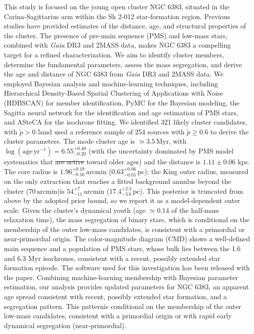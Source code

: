 \documentclass{aa}
\providecommand{\DIFaddtex}[1]{{\protect\color{red}\uwave{#1}}} %
\providecommand{\DIFdeltex}[1]{{\protect\color{red}\sout{#1}}} %
\providecommand{\DIFaddbegin}{} %
\providecommand{\DIFaddend}{} %
\providecommand{\DIFdelbegin}{} %
\providecommand{\DIFdelend}{} %
\providecommand{\DIFadd}[1]{\texorpdfstring{\DIFaddtex{#1}}{#1}} %
\providecommand{\DIFdel}[1]{\texorpdfstring{\DIFdeltex{#1}}{}} %
\providecommand{\DIFscaledelfig}{0.5}
\newlength{\DIFdelgraphicswidth} %
\newlength{\DIFdelgraphicsheight} %
\providecommand{\DIFaddincludegraphics}[2][]{{\color{blue}\fbox{\DIFOincludegraphics[#1]{#2}}}} %
\providecommand{\DIFdelincludegraphics}[2][]{%
\sbox{\DIFdelgraphicsbox}{\DIFOincludegraphics[#1]{#2}}%
\settoboxwidth{\DIFdelgraphicswidth}{\DIFdelgraphicsbox} %
\settoboxtotalheight{\DIFdelgraphicsheight}{\DIFdelgraphicsbox} %
\scalebox{\DIFscaledelfig}{%
\parbox[b]{\DIFdelgraphicswidth}{\usebox{\DIFdelgraphicsbox}\\[-\baselineskip] \rule{\DIFdelgraphicswidth}{0em}}\llap{\resizebox{\DIFdelgraphicswidth}{\DIFdelgraphicsheight}{%
\setlength{\unitlength}{\DIFdelgraphicswidth}%
\begin{picture}(1,1)%
\thicklines\linethickness{2pt} %
{\color[rgb]{1,0,0}\put(0,0){\framebox(1,1){}}}%
{\color[rgb]{1,0,0}\put(0,0){\line( 1,1){1}}}%
{\color[rgb]{1,0,0}\put(0,1){\line(1,-1){1}}}%
\end{picture}%
}\hspace*{3pt}}} %
} %
\DeclareRobustCommand{\DIFaddbegin}{\DIFOaddbegin \let\includegraphics\DIFaddincludegraphics} %
\DeclareRobustCommand{\DIFaddend}{\DIFOaddend \let\includegraphics\DIFOincludegraphics} %
\DeclareRobustCommand{\DIFdelbegin}{\DIFOdelbegin \let\includegraphics\DIFdelincludegraphics} %
\DeclareRobustCommand{\DIFdelend}{\DIFOaddend \let\includegraphics\DIFOincludegraphics} %
\begin{document}
  \abstract
   {This study is focused on the young open cluster NGC 6383, situated in the Carina-Sagittarius arm within the Sh 2-012 star-formation region. Previous studies have provided estimates of the distance, age, and structural properties of the cluster. The presence of pre-main sequence (PMS) and low-mass stars, combined with \textit{Gaia} DR3 and 2MASS data, makes NGC 6383 a compelling target for a refined characterization.}
   {We aim to identify cluster members, determine the fundamental parameters, assess the mass segregation, and derive the age and distance of NGC 6383 from \textit{Gaia} DR3 and 2MASS data.}
   {We employed Bayesian analysis and machine-learning techniques, including Hierarchical Density-Based Spatial Clustering of Applications with Noise (HDBSCAN) for member identification, PyMC for the Bayesian modeling, the Sagitta neural network for the identification and age estimation of PMS stars, and ASteCA for the isochrone fitting.}   
   {We identified 321 likely cluster candidates, with $\tilde{p}>0.5$\DIFaddbegin \DIFadd{, }\DIFaddend and used a reference sample of 254 sources with $\tilde{p}\geq0.6$ to derive the cluster parameters. The mode cluster age is $\simeq3.5\,\mathrm{Myr}$, with $\log(\mathrm{age}\,\mathrm{yr^{-1}}) = 6.55^{+0.40}_{-0.20}$ (with the uncertainty dominated by PMS model systematics that \DIFdelbegin \DIFdel{are active }\DIFdelend \DIFaddbegin \DIFadd{act }\DIFaddend toward older ages) and the distance is $1.11\pm 0.06$ kpc. The core radius is $1.96^{+0.19}_{-0.16}\,\mathrm{arcmin}$ ($0.63^{+0.06}_{-0.05}\,\mathrm{pc}$); the King outer radius, measured on the only extraction that reaches a fitted background annulus beyond the cluster ($70\,\mathrm{arcmin}$)\DIFaddbegin \DIFadd{, }\DIFaddend is $54^{+7}_{-11}\,\mathrm{arcmin}$ ($17.4^{+2.3}_{-3.6}\,\mathrm{pc}$). This posterior is truncated from above by the adopted prior bound, so we report it as a model-dependent outer scale. Given the cluster's dynamical youth (age $\simeq0.14$ of the half-mass relaxation time), the mass segregation of binary stars, which is conditional on the membership of the outer low-mass candidates, is consistent with a primordial or near-primordial origin. The color-magnitude diagram (CMD) shows a well-defined main sequence and a population of PMS stars, whose bulk lies between the 1.6 and 6.3 Myr isochrones, consistent with a recent, possibly extended star formation episode. The software used for this investigation has been released with the paper.}
   {Combining machine-learning membership with Bayesian parameter estimation, our analysis provides updated parameters for NGC 6383, an apparent age spread consistent with recent, possibly extended star formation, and a segregation pattern. This pattern\DIFaddbegin \DIFadd{, which }\DIFaddend is conditional on the membership of the outer low-mass candidates, \DIFaddbegin \DIFadd{is }\DIFaddend consistent with a primordial origin or with rapid early dynamical segregation (near-primordial).}
\end{document}
